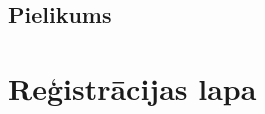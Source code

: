 \documentclass{LU}
\begin{document}
\renewcommand{\bibname}{Izmantotā literatūra un avoti}




\begin{appendices}
\chapter*{Pielikums}

\end{appendices}


\chapter*{Reģistrācijas lapa}

\end{document}
